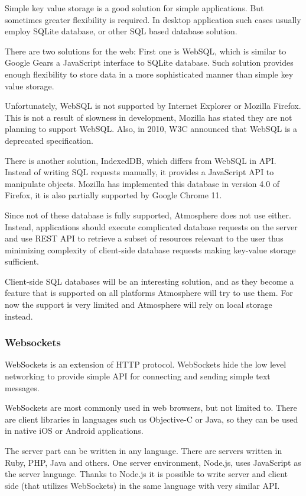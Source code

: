 Simple key value storage is a good solution for simple applications. But sometimes greater flexibility is required. In desktop application such cases usually employ SQLite database, or other SQL based database solution. 

There are two solutions for the web: First one is WebSQL, which is similar to Google Gears a JavaScript interface to SQLite database. Such solution provides enough flexibility to store data in a more sophisticated manner than simple key value storage.

Unfortunately, WebSQL is not supported by Internet Explorer or Mozilla Firefox. This is not a result of slowness in development, Mozilla has stated they are not planning to support WebSQL. \citep{mozilla_indexeddb} Also, in 2010, W3C announced that WebSQL is a deprecated specification. \citep{w3c_webdatabase}

There is another solution, IndexedDB, which differs from WebSQL in API. Instead of writing SQL requests manually, it provides a JavaScript API to manipulate objects. Mozilla has implemented this database in version 4.0 of Firefox, it is also partially supported by Google Chrome 11.

Since not of these database is fully supported, Atmosphere does not use either. Instead, applications should execute complicated database requests on the server and use REST API to retrieve a subset of resources relevant to the user thus minimizing complexity of client-side database requests making key-value storage sufficient.

Client-side SQL databases will be an interesting solution, and as they become a feature that is supported on all platforms Atmosphere will try to use them. For now the support is very limited and Atmosphere will rely on local storage instead.

\subsubsection{Websockets}

WebSockets is an extension of HTTP protocol. WebSockets hide the low level networking to provide simple API for connecting and sending simple text messages. 

WebSockets are most commonly used in web browsers, but not limited to. There are client libraries in languages such us Objective-C or Java, so they can be used in native iOS or Android applications.

The server part can be written in any language. There are servers written in Ruby, PHP, Java and others. One server environment, Node.js, uses JavaScript as the server language. Thanks to Node.js it is possible to write server and client side (that utilizes WebSockets) in the same language with very similar API.

